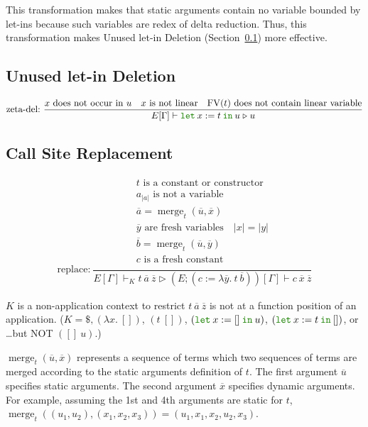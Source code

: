 \documentclass[a4paper,fleqn]{article}
\newcommand{\kwlet}{\mbox{\color{mygreen}\ttfamily let}}
\newcommand{\kwin}{\mbox{\color{mygreen}\ttfamily in}}
\newcommand{\lam}[2]{\lambda #1.\:#2}
\newcommand{\glodefB}[2]{(#1:=#2)}
\newcommand{\letin}[3]{\kwlet\:#1:=#2\:\kwin\:#3}
\DeclareMathOperator{\FV}{FV}
\DeclareMathOperator{\merg}{merge}
\newcommand{\secref}[1]{Section~\ref{#1}}
\newcommand{\reltri}{\mathrel{\triangleright}}
\newcommand{\rep}[1]{\overline{#1}}
\begin{document}
This transformation makes that static arguments contain no variable bounded by let-ins
because such variables are redex of delta reduction.
Thus, this transformation makes Unused let-in Deletion (\secref{sec:let-in-deletion}) more effective.

\subsection{Unused let-in Deletion}\label{sec:let-in-deletion}

\begin{gather*}
  \text{zeta-del:}~
    \dfrac{
      \text{$x$ does not occur in $u$} \quad \text{$x$ is not linear} \quad \text{$\FV(t)$ does not contain linear variable}
    }{E[\Gamma] \vdash \letin{x}{t}{u}
                       \reltri
                       u
    }
\end{gather*}

\subsection{Call Site Replacement}\label{sec:call-site-replacement}

\begin{gather*}
  \text{replace:}~
    \dfrac{
      \begin{gathered}
        \text{$t$ is a constant or constructor} \\
        \text{$a_{|a|}$ is not a variable} \\
        \rep{a} = \merg_t(\rep{u}, \rep{x}) \\
        \text{$\rep{y}$ are fresh variables} \quad
        |x| = |y| \\
        \rep{b} = \merg_t(\rep{u}, \rep{y}) \\
        \text{$c$ is a fresh constant} \\
      \end{gathered}
    }{E[\Gamma] \vdash_K t\:\rep{a}\:\rep{z}
      \reltri
      (E;\glodefB{c}{\lam{\rep{y}}{t\:\rep{b}}})[\Gamma] \vdash c\:\rep{x}\:\rep{z}
    }
\end{gather*}

$K$ is a non-application context to restrict $t\:\rep{a}\:\rep{z}$ is not at a function position of an application.
($K = \$, (\lam{x}{[]})$, $(t\:[])$, $(\letin{x}{[]}{u})$, $(\letin{x}{t}{[]})$, or \ldots but NOT $([]\:u)$.)

$\merg_t(\rep{u}, \rep{x})$ represents a sequence of terms which two sequences of terms are merged according to the static arguments definition of $t$.
The first argument $\rep{u}$ specifies static arguments.
The second argument $\rep{x}$ specifies dynamic arguments.
For example, assuming the 1st and 4th arguments are static for $t$, $\merg_t((u_1, u_2), (x_1, x_2, x_3)) = (u_1, x_1, x_2, u_2, x_3)$.
\end{document}
